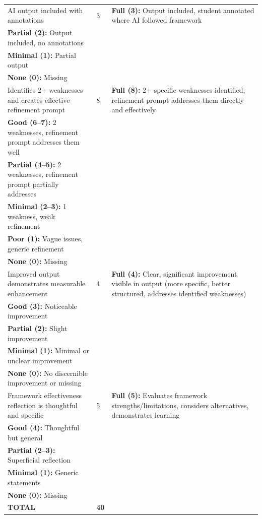 \documentclass[11pt]{article}
\begin{document}
\begin{longtable}{|p{5cm}|p{2cm}|p{8cm}|}
AI output included with annotations & 3 & 
\textbf{Full (3):} Output included, student annotated where AI followed framework \\
\textbf{Partial (2):} Output included, no annotations \\
\textbf{Minimal (1):} Partial output \\
\textbf{None (0):} Missing \\
\hline

Identifies 2+ weaknesses and creates effective refinement prompt & 8 & 
\textbf{Full (8):} 2+ specific weaknesses identified, refinement prompt addresses them directly and effectively \\
\textbf{Good (6--7):} 2 weaknesses, refinement prompt addresses them well \\
\textbf{Partial (4--5):} 2 weaknesses, refinement prompt partially addresses \\
\textbf{Minimal (2--3):} 1 weakness, weak refinement \\
\textbf{Poor (1):} Vague issues, generic refinement \\
\textbf{None (0):} Missing \\
\hline

Improved output demonstrates measurable enhancement & 4 & 
\textbf{Full (4):} Clear, significant improvement visible in output (more specific, better structured, addresses identified weaknesses) \\
\textbf{Good (3):} Noticeable improvement \\
\textbf{Partial (2):} Slight improvement \\
\textbf{Minimal (1):} Minimal or unclear improvement \\
\textbf{None (0):} No discernible improvement or missing \\
\hline

Framework effectiveness reflection is thoughtful and specific & 5 & 
\textbf{Full (5):} Evaluates framework strengths/limitations, considers alternatives, demonstrates learning \\
\textbf{Good (4):} Thoughtful but general \\
\textbf{Partial (2--3):} Superficial reflection \\
\textbf{Minimal (1):} Generic statements \\
\textbf{None (0):} Missing \\
\hline

\textbf{TOTAL} & \textbf{40} & \\
\hline
\end{longtable}
\end{document}
